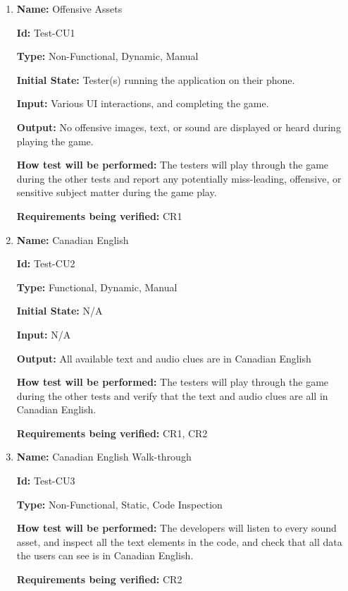 \documentclass[12pt, titlepage]{article}
\begin{document}
\begin{enumerate}

\item{\textbf{Name:} Offensive Assets} \label{itm:Test-CU1}

\textbf{Id:} Test-CU1

\textbf{Type:} Non-Functional, Dynamic, Manual
					
\textbf{Initial State:} Tester(s) running the application on their phone.
					
\textbf{Input:} Various UI interactions, and completing the game. 
					
\textbf{Output:} No offensive images, text, or sound are displayed or heard during playing the game.
					
\textbf{How test will be performed:} The testers will play through the game during the other tests and report any potentially miss-leading, offensive, or sensitive subject matter during the game play.

\textbf{Requirements being verified:} CR1
					
\item{\textbf{Name:} Canadian English} \label{itm:Test-CU2}

\textbf{Id:} Test-CU2

\textbf{Type:} Functional, Dynamic, Manual
					
\textbf{Initial State:} N/A
					
\textbf{Input:} N/A
					
\textbf{Output:} All available text and audio clues are in Canadian English
					
\textbf{How test will be performed:} The testers will play through the game during the other tests and verify that the text and audio clues are all in Canadian English. 

\textbf{Requirements being verified:} CR1, CR2

\item{\textbf{Name:} Canadian English Walk-through} \label{itm:Test-CU3}

\textbf{Id:} Test-CU3

\textbf{Type:} Non-Functional, Static, Code Inspection
									
\textbf{How test will be performed:} The developers will listen to every sound asset, and inspect all the text elements in the code, and check that all data the users can see is in Canadian English.

\textbf{Requirements being verified:} CR2

\end{enumerate}
\end{document}
